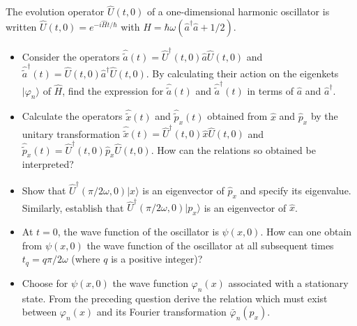 \documentclass[12pt,a4paper]{article}
\newenvironment{problem}[2][Problem]{\begin{trivlist}
\item[\hskip \labelsep {\bfseries #1}\hskip \labelsep {\bfseries #2.}]}{\end{trivlist}}
\begin{document}
\begin{problem}{5}
[C-T Exercise 5-8] The evolution operator $\hat{U}(t,0)$ of a one-dimensional harmonic oscillator is written $\hat{U}(t,0)=e^{-i\hat{H}t/\hbar}$ with $\hat{H}=\hbar\omega(\hat{a}^{\dagger}\hat{a}+1/2)$.
\begin{itemize}
\item[(a)] Consider the operators $\hat{\tilde{a}}(t)=\hat{U}^{\dagger}(t,0)\hat{a}\hat{U}(t,0)$ and $\hat{\tilde{a}}^{\dagger}(t)=\hat{U}(t,0)\hat{a}^{\dagger}\hat{U}(t,0)$. By calculating their action on the eigenkets $|\varphi_n\rangle$ of $\hat{H}$, find the expression for $\hat{\tilde{a}}(t)$ and $\hat{\tilde{a}}^{\dagger}(t)$ in terms of $\hat{a}$ and $\hat{a}^{\dagger}$.
\item[(b)] Calculate the operators $\hat{\tilde{x}}(t)$ and $\hat{\tilde{p}}_x(t)$ obtained from $\hat{x}$ and $\hat{p}_x$ by the unitary transformation $\hat{\tilde{x}}(t)=\hat{U}^{\dagger}(t,0)\hat{x}\hat{U}(t,0)$ and $\hat{\tilde{p}}_x(t)=\hat{U}^{\dagger}(t,0)\hat{p}_x\hat{U}(t,0)$. How can the relations so obtained be interpreted?
\item[(c)] Show that $\hat{U}^{\dagger}(\pi/2\omega,0)|x\rangle$ is an eigenvector of $\hat{p}_x$ and specify its eigenvalue. Similarly, establish that $\hat{U}^{\dagger}(\pi/2\omega,0)|p_x\rangle$ is an eigenvector of $\hat{x}$.
\item[(d)] At $t=0$, the wave function of the oscillator is $\psi(x,0)$. How can one obtain from $\psi(x,0)$ the wave function of the oscillator at all subsequent times $t_q=q\pi/2\omega$ (where $q$ is a positive integer)?
\item[(e)] Choose for $\psi(x,0)$ the wave function $\varphi_n(x)$ associated with a stationary state. From the preceding question derive the relation which must exist between $\varphi_n(x)$ and its Fourier transformation $\bar{\varphi}_n(p_x)$.
\end{itemize}
\end{problem}
\end{document}
